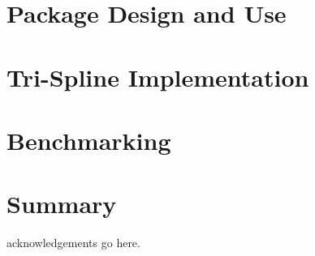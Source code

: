 \documentclass[12pt,floatfix,showpacs]{revtex4-1}
\begin{document}
\section{Package Design and Use}\label{sec:design}

\section{Tri-Spline Implementation}\label{sec:trispline}

\section{Benchmarking}\label{sec:benchmark}

\section{Summary}\label{sec:summary}


\begin{acknowledgements}
 acknowledgements go here.
\end{acknowledgements}



\end{document}
